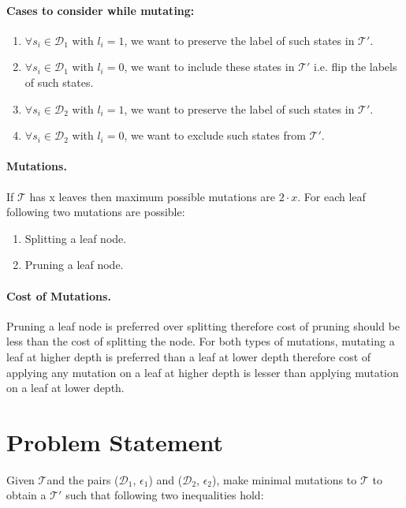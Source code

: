 \documentclass{llncs}
\newcommand{\candidate}{$\mathcal{T}$}
\newcommand{\distdata}{$\mathcal{D}_1$}
\newcommand{\validata}{$\mathcal{D}_2$}
\begin{document}
\paragraph{\textbf{Cases to consider while mutating:}}
\begin{enumerate}
	\item $\forall s_i \in \text{\distdata}$ with $l_i = 1$, we want to preserve the label of such states in $\mathcal{T}'$.
	\item  $\forall s_i \in \text{\distdata}$ with $l_i = 0$, we want to include these states in $\mathcal{T}'$ i.e. flip the labels of such states.
	\item $\forall s_i \in \text{\validata}$ with $l_i = 1$, we want to preserve the label of such states in $\mathcal{T}'$.
	\item $\forall s_i \in \text{\validata}$ with $l_i = 0$, we want to exclude such states from $\mathcal{T}'$.
\end{enumerate}

\paragraph{\textbf{Mutations.}}
If $\text{\candidate }$ has x leaves then maximum possible mutations are $2 \cdot x$. For each leaf following two mutations are possible:
\begin{enumerate}
	\item Splitting a leaf node.
	\item Pruning a leaf node.
\end{enumerate}

\paragraph{\textbf{Cost of Mutations.}}
Pruning a leaf node is preferred over splitting therefore cost of pruning should be less than the cost of splitting the node. For both types of mutations, mutating a leaf at higher depth is preferred than a leaf at lower depth therefore cost of applying any mutation on a leaf at higher depth is lesser than applying mutation on a leaf at lower depth.

\section{Problem Statement}

Given \candidate and the pairs (\distdata, $\epsilon_1$) and (\validata, $\epsilon_2$), make minimal mutations to $\text{\candidate }$ to obtain a $\mathcal{T}'$ such that following two inequalities hold:
\end{document}
